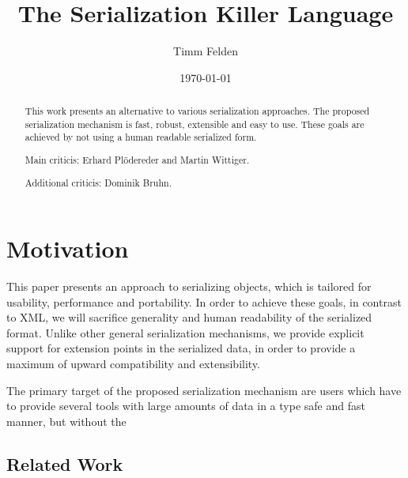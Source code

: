 \documentclass[a4paper,10pt]{article}
\title{The Serialization Killer Language}
\author{Timm Felden}
\date{\today}
\begin{document}
\maketitle

\begin{abstract}
 This work presents an alternative to various serialization approaches. The proposed serialization mechanism is fast, robust, extensible and easy to use. These goals are achieved by not using a human readable serialized form. 
\end{abstract}


\renewcommand{\abstractname}{Acknowledgements}
\begin{abstract}
Main criticis: Erhard Plödereder and Martin Wittiger.

Additional criticis: Dominik Bruhn.
\end{abstract}

\section{Motivation}

This paper presents an approach to serializing objects, which is tailored for usability, performance and portability. In order to achieve these goals, in contrast to XML, we will sacrifice generality and human readability of the serialized format. Unlike other general serialization mechanisms, we provide explicit support for extension points in the serialized data, in order to provide a maximum of upward compatibility and extensibility.

The primary target of the proposed serialization mechanism are users which have to provide several tools with large amounts of data in a type safe and fast manner, but without the 

\subsection{Related Work}
\end{document}
